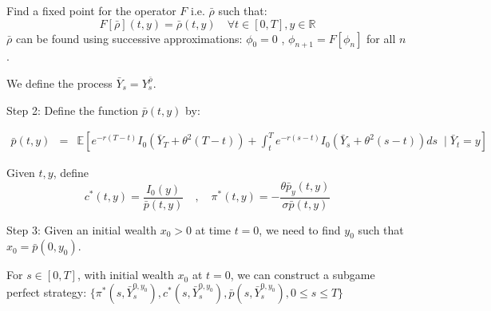 \documentclass[11pt, psfig]{article}
\theoremstyle{definition}
\theoremstyle{remark}
\numberwithin{equation}{section}
\def\sR{\mathbb{R}}
\def\sR{\mathbb{R}}
\def\sE{\mathbb{E}}
\begin{document}
Find a fixed point for the operator $F$ i.e. $\bar{\rho}$ such that:
\begin{equation*}
F[\bar{\rho}](t,y)= \bar{\rho}(t,y) \quad \forall t\in[0,T], y\in \sR
\end{equation*}
$\bar{\rho}$ can be found using successive approximations: $\phi_0 =0$ , $\phi_{n+1}=F[\phi_n]$ for all $n$.

We define the process $\bar{Y}_s=Y_s^{\bar{\rho}}$.

Step 2:  
Define the function $\bar{p}(t,y)$ by:

\begin{eqnarray*}
\bar{p}(t,y) &=& \sE\left[  e^{-r(T-t) } I_{0}(\bar{Y}_T+\theta^2(T-t))+\int_{t}^T e^{- r(s-t) } I_{0}(\bar{Y}_s+\theta^2(s-t))ds  \;\; \bigg|\; \bar{Y}_t=y \right]
\end{eqnarray*}

Given $t, y$, define 
$$c^{*}(t,y) = \frac{I_{0}(y)}{\bar{p}(t,y)} \quad , \quad \pi^{*}(t,y) = -\frac{\theta \bar{p}_y(t,y)}{\sigma \bar{p}(t,y)} $$

Step 3:
Given an initial wealth $x_0>0$ at time $t=0$, we need to find $y_0$ such that $x_0=\bar{p}(0, y_0)$.

For $s\in [0,T]$, with initial wealth $x_0$ at $t=0$, we can construct a subgame perfect strategy: 
$\{\pi^{*}(s,\bar{Y}_s^{0, y_0}), c^{*}(s,\bar{Y}_s^{0, y_0}), \bar{p}(s, \bar{Y}_s^{0, y_0}), 0\leq s\leq T \}$ 
\end{document}

